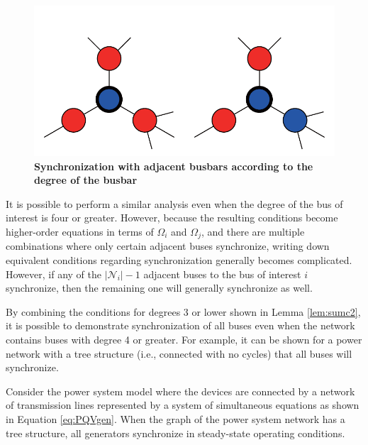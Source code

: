 \documentclass[graybox, envcountchap]{svmult}
\begin{document}
\begin{figure}[t]
{\begin{minipage}{0.24\linewidth}
  \end{minipage}
  \label{fig:N2}
  \begin{minipage}{0.48\linewidth}
    \centering
    \includegraphics[width = .85\linewidth]{figs/3degbus}
  \end{minipage}
  \medskip
  \caption{\centering\textbf{Synchronization with adjacent busbars according to
  the degree of the busbar}}
  \label{fig:bussync}
  }
\medskip
\end{figure}
It is possible to perform a similar analysis even when the degree of the bus of
interest is four or greater. However, because the resulting conditions become
higher-order equations in terms of $\Omega_i$ and $\Omega_j$, and there are
multiple combinations where only certain adjacent buses synchronize, writing
down equivalent conditions regarding synchronization generally becomes
complicated. However, if any of the $|\mathcal{N}_i|-1$ adjacent buses to the
bus of interest $i$ synchronize, then the remaining one will generally
synchronize as well.

By combining the conditions for degrees 3 or lower shown in Lemma
\ref{lem:sumc2}, it is possible to demonstrate synchronization of all buses even
when the network contains buses with degree 4 or greater. For example, it can be
shown for a power network with a tree structure (i.e., connected with no cycles)
that all buses will synchronize.

\begin{theorem}
\label{thm:tree}
Consider the power system model where the devices are connected by a network of
transmission lines represented by a system of simultaneous equations as shown in
Equation \ref{eq:PQVgen}. When the graph of the power system network has a tree
structure, all generators synchronize in steady-state operating conditions.
\end{theorem}
\end{document}

